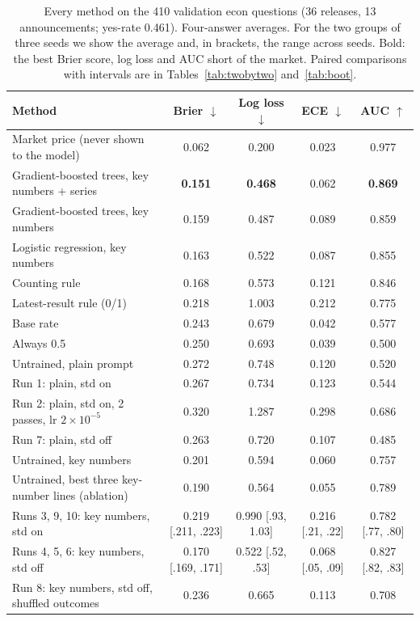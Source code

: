 \documentclass[11pt]{article}
\begin{document}
\begin{table}[t]
\centering\small
\caption{Every method on the 410 validation econ questions (36 releases, 13 announcements; yes-rate 0.461). Four-answer averages. For the two groups of three seeds we show the average and, in brackets, the range across seeds. Bold: the best Brier score, log loss and AUC short of the market. Paired comparisons with intervals are in Tables~\ref{tab:twobytwo} and~\ref{tab:boot}.}
\label{tab:main}
\setlength{\tabcolsep}{4pt}
\begin{tabular}{lcccc}
\toprule
Method & Brier $\downarrow$ & Log loss $\downarrow$ & ECE $\downarrow$ & AUC $\uparrow$ \\
\midrule
Market price (never shown to the model) & 0.062 & 0.200 & 0.023 & 0.977 \\
\midrule
Gradient-boosted trees, key numbers + series & \textbf{0.151} & \textbf{0.468} & 0.062 & \textbf{0.869} \\
Gradient-boosted trees, key numbers & 0.159 & 0.487 & 0.089 & 0.859 \\
Logistic regression, key numbers & 0.163 & 0.522 & 0.087 & 0.855 \\
Counting rule & 0.168 & 0.573 & 0.121 & 0.846 \\
Latest-result rule (0/1) & 0.218 & 1.003 & 0.212 & 0.775 \\
Base rate & 0.243 & 0.679 & 0.042 & 0.577 \\
Always 0.5 & 0.250 & 0.693 & 0.039 & 0.500 \\
\midrule
Untrained, plain prompt & 0.272 & 0.748 & 0.120 & 0.520 \\
Run 1: plain, std on & 0.267 & 0.734 & 0.123 & 0.544 \\
Run 2: plain, std on, 2 passes, lr $2\times10^{-5}$ & 0.320 & 1.287 & 0.298 & 0.686 \\
Run 7: plain, std off & 0.263 & 0.720 & 0.107 & 0.485 \\
\midrule
Untrained, key numbers & 0.201 & 0.594 & 0.060 & 0.757 \\
Untrained, best three key-number lines (ablation) & 0.190 & 0.564 & 0.055 & 0.789 \\
Runs 3, 9, 10: key numbers, std on & 0.219 {\scriptsize[.211, .223]} & 0.990 {\scriptsize[.93, 1.03]} & 0.216 {\scriptsize[.21, .22]} & 0.782 {\scriptsize[.77, .80]} \\
Runs 4, 5, 6: key numbers, std off & 0.170 {\scriptsize[.169, .171]} & 0.522 {\scriptsize[.52, .53]} & 0.068 {\scriptsize[.05, .09]} & 0.827 {\scriptsize[.82, .83]} \\
Run 8: key numbers, std off, shuffled outcomes & 0.236 & 0.665 & 0.113 & 0.708 \\
\bottomrule
\end{tabular}
\end{table}
\end{document}

